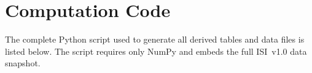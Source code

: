 \section{Computation Code}\label{app:code}

The complete Python script used to generate all derived tables and
data files is listed below.  The script requires only NumPy and
embeds the full ISI~v1.0 data snapshot.


